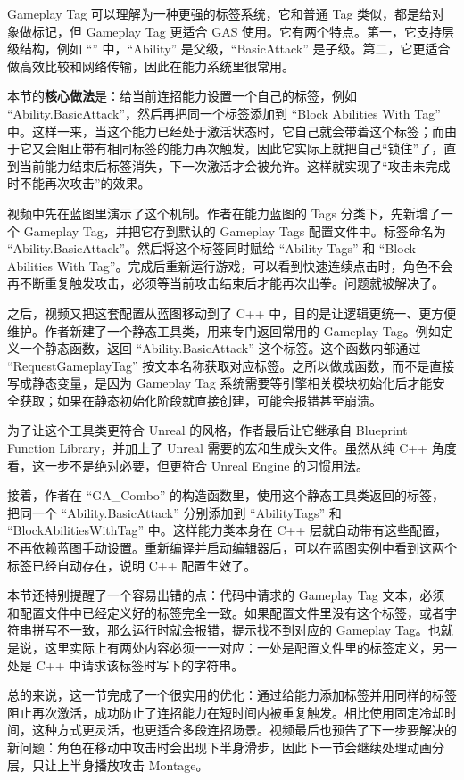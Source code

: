 Gameplay Tag 可以理解为一种更强的标签系统，它和普通 Tag 类似，都是给对象做标记，但 Gameplay Tag 更适合 GAS 使用。它有两个特点。第一，它支持层级结构，例如 ``'' 中，``Ability'' 是父级，``BasicAttack'' 是子级。第二，它更适合做高效比较和网络传输，因此在能力系统里很常用。

本节的\textbf{核心做法}是：给当前连招能力设置一个自己的标签，例如 ``Ability.BasicAttack''，然后再把同一个标签添加到 ``Block Abilities With Tag'' 中。这样一来，当这个能力已经处于激活状态时，它自己就会带着这个标签；而由于它又会阻止带有相同标签的能力再次触发，因此它实际上就把自己“锁住”了，直到当前能力结束后标签消失，下一次激活才会被允许。这样就实现了“攻击未完成时不能再次攻击”的效果。

视频中先在蓝图里演示了这个机制。作者在能力蓝图的 Tags 分类下，先新增了一个 Gameplay Tag，并把它存到默认的 Gameplay Tags 配置文件中。标签命名为 ``Ability.BasicAttack''。然后将这个标签同时赋给 ``Ability Tags'' 和 ``Block Abilities With Tag''。完成后重新运行游戏，可以看到快速连续点击时，角色不会再不断重复触发攻击，必须等当前攻击结束后才能再次出拳。问题就被解决了。

之后，视频又把这套配置从蓝图移动到了 C++ 中，目的是让逻辑更统一、更方便维护。作者新建了一个静态工具类，用来专门返回常用的 Gameplay Tag。例如定义一个静态函数，返回 ``Ability.BasicAttack'' 这个标签。这个函数内部通过 ``RequestGameplayTag'' 按文本名称获取对应标签。之所以做成函数，而不是直接写成静态变量，是因为 Gameplay Tag 系统需要等引擎相关模块初始化后才能安全获取；如果在静态初始化阶段就直接创建，可能会报错甚至崩溃。

为了让这个工具类更符合 Unreal 的风格，作者最后让它继承自 Blueprint Function Library，并加上了 Unreal 需要的宏和生成头文件。虽然从纯 C++ 角度看，这一步不是绝对必要，但更符合 Unreal Engine 的习惯用法。

接着，作者在 ``GA\_Combo'' 的构造函数里，使用这个静态工具类返回的标签，把同一个 ``Ability.BasicAttack'' 分别添加到 ``AbilityTags'' 和 ``BlockAbilitiesWithTag'' 中。这样能力类本身在 C++ 层就自动带有这些配置，不再依赖蓝图手动设置。重新编译并启动编辑器后，可以在蓝图实例中看到这两个标签已经自动存在，说明 C++ 配置生效了。

本节还特别提醒了一个容易出错的点：代码中请求的 Gameplay Tag 文本，必须和配置文件中已经定义好的标签完全一致。如果配置文件里没有这个标签，或者字符串拼写不一致，那么运行时就会报错，提示找不到对应的 Gameplay Tag。也就是说，这里实际上有两处内容必须一一对应：一处是配置文件里的标签定义，另一处是 C++ 中请求该标签时写下的字符串。

总的来说，这一节完成了一个很实用的优化：通过给能力添加标签并用同样的标签阻止再次激活，成功防止了连招能力在短时间内被重复触发。相比使用固定冷却时间，这种方式更灵活，也更适合多段连招场景。视频最后也预告了下一步要解决的新问题：角色在移动中攻击时会出现下半身滑步，因此下一节会继续处理动画分层，只让上半身播放攻击 Montage。




